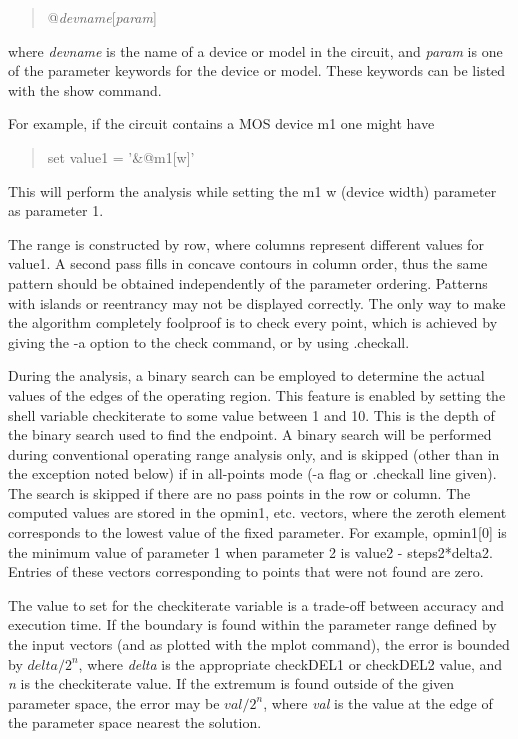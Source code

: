 \begin{enumerate}
{\begin{quote}
{\vt @}{\it devname\/}{\vt [}{\it param\/}{\vt ]}
\end{quote}

where {\it devname} is the name of a device or model in the circuit,
and {\it param} is one of the parameter keywords for the device or
model.  These keywords can be listed with the {\cb show} command.

For example, if the circuit contains a MOS device {\vt m1} one might
have

\begin{quote}
{\vt set value1 = '\&@m1[w]'}
\end{quote}

This will perform the analysis while setting the {\vt m1}
{\vt w} (device width) parameter as parameter 1.
}
\end{enumerate}

The range is constructed by row, where columns represent different values
for {\et value1}.  A second pass fills in concave contours in column
order, thus the same pattern should be obtained independently of the
parameter ordering.  Patterns with islands or reentrancy may not
be displayed correctly.  The only way to make the algorithm completely
foolproof is to check every point, which is achieved by giving the
{\vt -a} option to the {\cb check} command, or by using {\vt .checkall}.

During the analysis, a binary search can be employed to determine the
actual values of the edges of the operating region.  This feature is
enabled by setting the shell variable {\et checkiterate} to some value
between 1 and 10.  This is the depth of the binary search used to find
the endpoint.  A binary search will be performed during conventional
operating range analysis only, and is skipped (other than in the
exception noted below) if in all-points mode ({\vt -a} flag or {\vt
.checkall} line given).  The search is skipped if there are no pass
points in the row or column.  The computed values are stored in the
{\et opmin1}, etc. vectors, where the zeroth element corresponds to
the lowest value of the fixed parameter.  For example, {\vt opmin1[0]}
is the minimum value of parameter 1 when parameter 2 is value2 -
steps2*delta2.  Entries of these vectors corresponding to points that
were not found are zero.

The value to set for the {\et checkiterate} variable is a trade-off
between accuracy and execution time.  If the boundary is found within
the parameter range defined by the input vectors (and as plotted with
the {\cb mplot} command), the error is bounded by $delta/2^n$, where
{\it delta} is the appropriate {\et checkDEL1} or {\et checkDEL2}
value, and {\it n} is the {\et checkiterate} value.  If the extremum
is found outside of the given parameter space, the error may be
$val/2^n$, where {\it val} is the value at the edge of the parameter
space nearest the solution.

